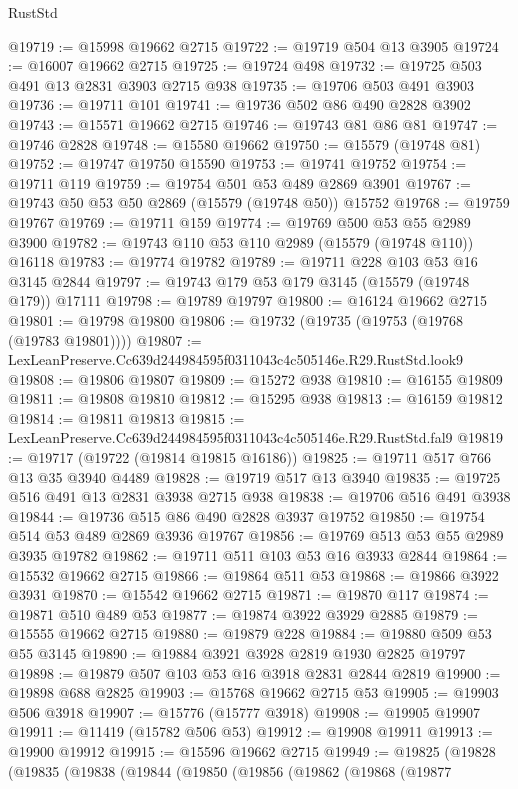 \begin{lexlean}{RustStd}
\begin{coremodule}
@19719 := @15998 @19662 @2715
@19722 := @19719 @504 @13 @3905
@19724 := @16007 @19662 @2715
@19725 := @19724 @498
@19732 := @19725 @503 @491 @13 @2831 @3903 @2715 @938
@19735 := @19706 @503 @491 @3903
@19736 := @19711 @101
@19741 := @19736 @502 @86 @490 @2828 @3902
@19743 := @15571 @19662 @2715
@19746 := @19743 @81 @86 @81
@19747 := @19746 @2828
@19748 := @15580 @19662
@19750 := @15579 (@19748 @81)
@19752 := @19747 @19750 @15590
@19753 := @19741 @19752
@19754 := @19711 @119
@19759 := @19754 @501 @53 @489 @2869 @3901
@19767 := @19743 @50 @53 @50 @2869 (@15579 (@19748 @50)) @15752
@19768 := @19759 @19767
@19769 := @19711 @159
@19774 := @19769 @500 @53 @55 @2989 @3900
@19782 := @19743 @110 @53 @110 @2989 (@15579 (@19748 @110)) @16118
@19783 := @19774 @19782
@19789 := @19711 @228 @103 @53 @16 @3145 @2844
@19797 := @19743 @179 @53 @179 @3145 (@15579 (@19748 @179)) @17111
@19798 := @19789 @19797
@19800 := @16124 @19662 @2715
@19801 := @19798 @19800
@19806 := @19732 (@19735 (@19753 (@19768 (@19783 @19801))))
@19807 := LexLeanPreserve.Cc639d244984595f0311043c4c505146e.R29.RustStd.look9
@19808 := @19806 @19807
@19809 := @15272 @938
@19810 := @16155 @19809
@19811 := @19808 @19810
@19812 := @15295 @938
@19813 := @16159 @19812
@19814 := @19811 @19813
@19815 := LexLeanPreserve.Cc639d244984595f0311043c4c505146e.R29.RustStd.fal9
@19819 := @19717 (@19722 (@19814 @19815 @16186))
@19825 := @19711 @517 @766 @13 @35 @3940 @4489
@19828 := @19719 @517 @13 @3940
@19835 := @19725 @516 @491 @13 @2831 @3938 @2715 @938
@19838 := @19706 @516 @491 @3938
@19844 := @19736 @515 @86 @490 @2828 @3937 @19752
@19850 := @19754 @514 @53 @489 @2869 @3936 @19767
@19856 := @19769 @513 @53 @55 @2989 @3935 @19782
@19862 := @19711 @511 @103 @53 @16 @3933 @2844
@19864 := @15532 @19662 @2715
@19866 := @19864 @511 @53
@19868 := @19866 @3922 @3931
@19870 := @15542 @19662 @2715
@19871 := @19870 @117
@19874 := @19871 @510 @489 @53
@19877 := @19874 @3922 @3929 @2885
@19879 := @15555 @19662 @2715
@19880 := @19879 @228
@19884 := @19880 @509 @53 @55 @3145
@19890 := @19884 @3921 @3928 @2819 @1930 @2825 @19797
@19898 := @19879 @507 @103 @53 @16 @3918 @2831 @2844 @2819
@19900 := @19898 @688 @2825
@19903 := @15768 @19662 @2715 @53
@19905 := @19903 @506 @3918
@19907 := @15776 (@15777 @3918)
@19908 := @19905 @19907
@19911 := @11419 (@15782 @506 @53)
@19912 := @19908 @19911
@19913 := @19900 @19912
@19915 := @15596 @19662 @2715
@19949 := @19825
    (@19828
      (@19835
        (@19838
          (@19844
            (@19850
              (@19856
                (@19862
                  (@19868
                    (@19877

\end{coremodule}
\end{lexlean}
